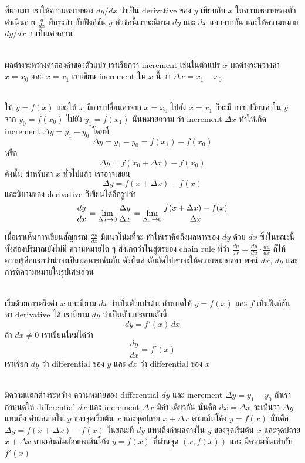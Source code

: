 \documentclass[
]{book}
\begin{document}
ที่ผ่านมา เราให้ความหมายของ \(dy/dx\) ว่าเป็น derivative ของ \(y\) เทียบกับ
\(x\) ในความหมายของตัวดำเนินการ \(\frac{d}{dx}\) ที่กระทำ กับฟังก์ชัน \(y\)
หัวข้อนี้เราจะนิยาม \(dy\) และ \(dx\) แยกจากกัน และให้ความหมาย \(dy/dx\)
ว่าเป็นเศษส่วน\\
\strut \\
ผลต่างระหว่างค่าสองค่าของตัวแปร เราเรียกว่า increment เช่นในตัวแปร \(x\)
ผลต่างระหว่างค่า \(x=x_0\) และ \(x=x_1\) เราเขียน increment ใน \(x\) นี้ ว่า
\(\Delta x = x_1-x_0\)\\
\strut \\
ให้ \(y=f(x)\) และให้ \(x\) มีการเปลี่ยนค่าจาก \(x=x_0\) ไปยัง \(x=x_1\) ก็จะมี
การเปลี่ยนค่าใน \(y\) จาก \(y_0 = f(x_0)\) ไปยัง \(y_1= f(x_1)\) นั่นหมายความ
ว่า increment \(\Delta x\) ทำให้เกิด increment \(\Delta y = y_1-y_0\) โดยที่
\[\Delta y = y_1-y_0 = f(x_1) - f(x_0)\] หรือ
\[\Delta y = f(x_0+\Delta x) - f(x_0)\] ดังนั้น สำหรับค่า \(x\) ทั่วไปแล้ว
เราอาจเขียน \[\Delta y = f(x+ \Delta x) - f(x)\] และนิยามของ derivative
ก็เขียนได้อีกรูปว่า
\[\frac{dy}{dx} = \lim_{\Delta x \to 0} \frac{\Delta y}{\Delta x} \\
    = \lim_{\Delta x \to 0} \frac{f(x+\Delta x) - f(x)}{\Delta x}\]

เมื่อเราเห็นการเขียนสัญกรณ์ \(\displaystyle \frac{dy}{dx}\) มีแนวโน้มที่จะ
ทำให้เราคิดถึงผลหารของ \(dy\) ด้วย \(dx\) ซึ่งในขณะนี้ ทั้งสองปริมาณยังไม่มี
ความหมายใด ๆ สังเกตว่าในสูตรของ chain rule ที่ว่า
\(\displaystyle \frac{dy}{dx} = \frac{dy}{du} \cdot \frac{du}{dx}\) ก็ให้
ความรู้สึกแรกว่าน่าจะเป็นผลหารเช่นกัน ดังนั้นลำดับถัดไปเราจะให้ความหมายของ พจน์ \(dx\),
\(dy\) และการตีความหมายในรูปเศษส่วน\\
\strut \\
เริ่มด้วยการตรึงค่า \(x\) และนิยาม \(dx\) ว่าเป็นตัวแปรต้น กำหนดให้ \(y = f(x)\)
และ \(f\) เป็นฟังก์ชัน หา derivative ได้ เรานิยาม \(dy\) ว่าเป็นตัวแปรตามดังนี้
\[\boxed{
    dy = f'(x)\,dx
}\] ถ้า \(dx \ne 0\) เราเขียนใหม่ได้ว่า \[\frac{dy}{dx} = f'(x)\] เราเรียก
\(dy\) ว่า differential ของ \(y\) และ \(dx\) ว่า differential ของ \(x\)\\
\strut \\
มีความแตกต่างระหว่าง ความหมายของ differential \(dy\) และ increment
\(\Delta y = y_1-y_0\) ถ้าเรากำหนดให้ differential \(dx\) และ increment
\(\Delta x\) มีค่า เดียวกัน นั่นคือ \(dx = \Delta x\) จะเห็นว่า \(\Delta y\)
แทนถึง ค่าผลต่างใน \(y\) ของจุดเริ่มต้น \(x\) และจุดปลาย \(x+\Delta x\)
ตามเส้นโค้ง \(y = f(x)\) นั่นคือ \(\Delta y = f(x+\Delta x) - f(x)\) ในขณะที่
\(dy\) แทนถึงค่าผลต่างใน \(y\) ของจุดเริ่มต้น \(x\) และจุดปลาย \(x+\Delta
x\) ตามเส้นสัมผัสของเส้นโค้ง \(y=f(x)\) ที่ผ่านจุด \((x,f(x))\) และ มีความชันเท่ากับ
\(f'(x)\)
\end{document}
